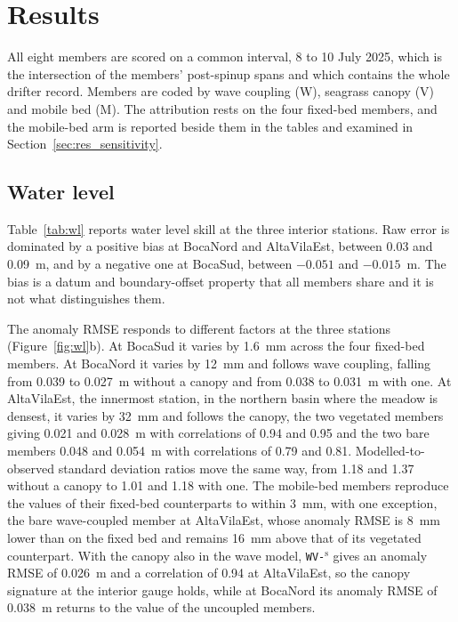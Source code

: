 \section{Results}
\label{sec:results}

All eight members are scored on a common interval, 8 to 10 July 2025, which is
the intersection of the members' post-spinup spans and which contains the whole
drifter record. Members are coded by wave coupling (W), seagrass canopy (V) and
mobile bed (M). The attribution rests on the four fixed-bed members, and the
mobile-bed arm is reported beside them in the tables and examined in
Section~\ref{sec:res_sensitivity}.

\subsection{Water level}
\label{sec:res_wl}

Table~\ref{tab:wl} reports water level skill at the three interior stations.
Raw error is dominated by a positive bias at BocaNord and AltaVilaEst, between
0.03 and 0.09~m, and by a negative one at BocaSud, between $-0.051$ and
$-0.015$~m. The bias is a datum and boundary-offset property that all members
share and it is not what distinguishes them.

The anomaly RMSE responds to different factors at the three stations
(Figure~\ref{fig:wl}b). At BocaSud it varies by 1.6~mm across the four
fixed-bed members. At BocaNord it varies by 12~mm and follows wave coupling,
falling from 0.039 to 0.027~m without a canopy and from 0.038 to 0.031~m with
one. At AltaVilaEst, the innermost station, in the northern basin where the meadow
is densest, it varies by 32~mm and follows the canopy, the two
vegetated members giving 0.021 and 0.028~m with correlations of 0.94 and 0.95
and the two bare members 0.048 and 0.054~m with correlations of 0.79 and 0.81.
Modelled-to-observed standard deviation ratios move the same way, from 1.18 and
1.37 without a canopy to 1.01 and 1.18 with one. The mobile-bed members
reproduce the values of their fixed-bed counterparts to within 3~mm, with one
exception, the bare wave-coupled member at AltaVilaEst, whose anomaly RMSE is
8~mm lower than on the fixed bed and remains 16~mm above that of its vegetated
counterpart. With the canopy also in the wave model, \texttt{WV{-}}$^{\mathrm{s}}$
gives an anomaly RMSE of 0.026~m and a correlation of 0.94 at AltaVilaEst, so
the canopy signature
at the interior gauge holds, while at BocaNord its anomaly RMSE of 0.038~m
returns to the value of the uncoupled members.

